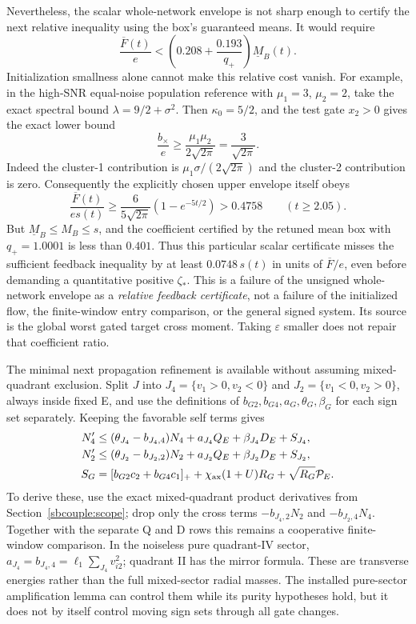\documentclass{article} %
\theoremstyle{plain}
\theoremstyle{definition}
\theoremstyle{remark}
\begin{document}
Nevertheless, the scalar whole-network envelope is not sharp enough to
certify the next relative inequality using the box's guaranteed means.
It would require
\begin{equation}\label{sbwindow:first-unclosed}
 \frac{\overline F(t)}e
 <\left(0.208+\frac{0.193}{q_+}\right)\underline M_B(t).
\end{equation}
Initialization smallness alone cannot make this relative cost vanish.
For example, in the high-SNR equal-noise population reference with
$\mu_1=3$, $\mu_2=2$, take the exact spectral bound
$\lambda=9/2+\sigma^2$. Then $\kappa_0=5/2$, and the test gate $x_2>0$
gives the exact lower bound
\[
 \frac{b_\times}{e}\ge\frac{\mu_1\mu_2}{2\sqrt{2\pi}}
                      =\frac3{\sqrt{2\pi}}.
\]
Indeed the cluster-1 contribution is
$\mu_1\sigma/(2\sqrt{2\pi})$ and the cluster-2 contribution is zero.
Consequently the explicitly chosen upper envelope itself obeys
\[
 \frac{\overline F(t)}{e s(t)}\ge
 \frac6{5\sqrt{2\pi}}(1-e^{-5t/2})>0.4758
                 \qquad(t\ge2.05).
\]
But $\underline M_B\le M_B\le s$, and the coefficient certified by the
retuned mean box with $q_+=1.0001$ is less than $0.401$.
Thus this particular scalar certificate misses the sufficient feedback
inequality by at least $0.0748\,s(t)$ in units of $\overline F/e$, even
before demanding a quantitative positive $\zeta_*$.
This is a failure of the unsigned whole-network envelope as a
\emph{relative feedback certificate}, not a failure of the initialized
flow, the finite-window entry comparison, or the general signed system.
Its source is the global worst gated target cross moment. Taking
$\varepsilon$ smaller does not repair that coefficient ratio.

The minimal next propagation refinement is available without assuming
mixed-quadrant exclusion. Split $J$ into
$J_4=\{v_1>0,v_2<0\}$ and $J_2=\{v_1<0,v_2>0\}$, always inside fixed E,
and use the definitions of $b_{G2},b_{G4},a_G,\theta_G,\beta_G$ for each
sign set separately. Keeping the favorable self terms gives
\begin{align}
 N_4'&\le(\theta_{J_4}-b_{J_4,4})N_4+a_{J_4}Q_E+
             \beta_{J_4}D_E+S_{J_4},\label{sbwindow:N4}\\
 N_2'&\le(\theta_{J_2}-b_{J_2,2})N_2+a_{J_2}Q_E+
             \beta_{J_2}D_E+S_{J_2},\label{sbwindow:N2}\\
 S_G&=[b_{G2}c_2+b_{G4}c_1]_+
             +\chi_{\rm ax}(1+U)R_G+\sqrt{R_G}\mathcal P_E.\nonumber
\end{align}
To derive these, use the exact mixed-quadrant product derivatives from
Section~\ref{sbcouple:scope}; drop only the cross terms
$-b_{J_4,2}N_2$ and $-b_{J_2,4}N_4$. Together with the separate Q and D
rows this remains a cooperative finite-window comparison. In the
noiseless pure quadrant-IV sector,
$a_{J_4}=b_{J_4,4}=\ell_1\sum_{J_4}v_{i2}^2$; quadrant II has the
mirror formula. These are transverse energies rather than the full
mixed-sector radial masses. The installed pure-sector amplification
lemma can control them while its purity hypotheses hold, but it does
not by itself control moving sign sets through all gate changes.
\end{document}
